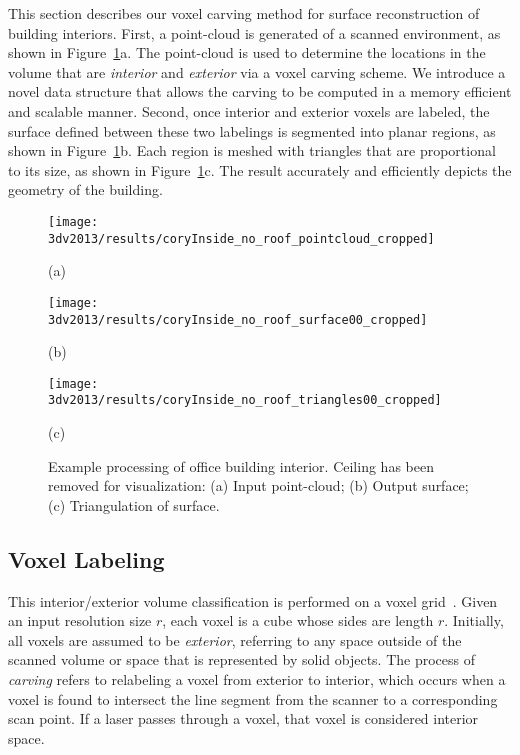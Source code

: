 \documentclass[12pt,onecolumn,oneside]{book}
\begin{document}
This section describes our voxel carving method for surface reconstruction of building interiors.  First, a point-cloud is generated of a scanned environment, as shown in Figure~\ref{fig:3dv2013_mydesk}a.  The point-cloud is used to determine the locations in the volume that are {\it interior} and {\it exterior} via a voxel carving scheme.  We introduce a novel data structure that allows the carving to be computed in a memory efficient and scalable manner.  Second, once interior and exterior voxels are labeled, the surface defined between these two labelings is segmented into planar regions, as shown in Figure~\ref{fig:3dv2013_mydesk}b.  Each region is meshed with triangles that are proportional to its size, as shown in Figure~\ref{fig:3dv2013_mydesk}c.  The result accurately and efficiently depicts the geometry of the building.

\begin{figure}[t]

	\begin{minipage}[b]{0.3\linewidth}
	\centerline{\texttt{[image: 3dv2013/results/coryInside\_no\_roof\_pointcloud\_cropped]}}
	\centerline{(a)}\medskip
	\end{minipage}
	\hfill
	\begin{minipage}[b]{0.3\linewidth}
	\centerline{\texttt{[image: 3dv2013/results/coryInside\_no\_roof\_surface00\_cropped]}}
	\centerline{(b)}\medskip
	\end{minipage}
	\hfill
	\begin{minipage}[b]{0.3\linewidth}
	\centerline{\texttt{[image: 3dv2013/results/coryInside\_no\_roof\_triangles00\_cropped]}}
	\centerline{(c)}\medskip
	\end{minipage}

\caption[Example processing of office building interior.]{Example processing of office building interior.  Ceiling has been removed for visualization:  (a) Input point-cloud; (b) Output surface; (c) Triangulation of surface.}
\label{fig:3dv2013_mydesk}
\end{figure}

\subsection{Voxel Labeling}
\label{ssec:voxel_labeling}

This interior/exterior volume classification is performed on a voxel grid~\cite{Turner13}.  Given an input resolution size $r$, each voxel is a cube whose sides are length $r$.  Initially, all voxels are assumed to be {\it exterior}, referring to any space outside of the scanned volume or space that is represented by solid objects.  The process of {\it carving} refers to relabeling a voxel from exterior to interior, which occurs when a voxel is found to intersect the line segment from the scanner to a corresponding scan point.  If a laser passes through a voxel, that voxel is considered interior space.
\end{document}
